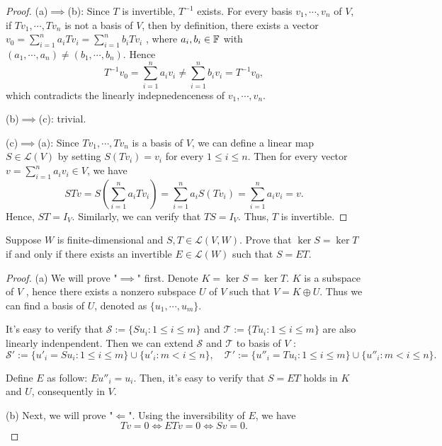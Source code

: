 \documentclass{article}
\begin{document}
\begin{proof}
    (a)\( \implies \)(b): Since \( T  \) is invertible, \( T^{-1} \) exists. For every basis \( v_1,\cdots,v_n \) of \( V \), if \( Tv_1,\cdots,Tv_n \) is not a basis of \( V \), then by definition, there exists a vector \( v_0=\sum_{i=1}^{n} a_iTv_i=\sum_{i=1}^{n} b_iTv_i \) , where \( a_i,b_i\in\mathbb{F} \) with \( (a_1,\cdots,a_n)\neq(b_1,\cdots,b_n) \). Hence
    \[ T^{-1}v_0=\sum_{i=1}^{n} a_iv_i\neq \sum_{i=1}^{n} b_iv_i=T^{-1}v_0, \] 
    which contradicts the linearly indepnedenceness of \( v_1,\cdots,v_n \).\par
    (b)\( \implies \)(c): trivial.\par
    (c)\( \implies \)(a): Since \( Tv_1,\cdots,Tv_n \) is a basis of \( V \), we can define a linear map \( S\in\mathcal{L}(V) \) by setting \( S(Tv_i)=v_i \) for every \( 1\le i\le n \). Then for every vector \( v=\sum_{i=1}^n a_i v_i\in V  \), we have
    \[ STv=S\left(\sum_{i=1}^n a_i Tv_i\right)=\sum_{i=1}^n a_i S(Tv_i)=\sum_{i=1}^n a_i v_i=v. \]
    Hence, \( ST=I_V  \). Similarly, we can verify that \( TS=I_V  \). Thus, \( T  \) is invertible.
\end{proof}

\begin{problem}[3D-6]
    Suppose \( W \) is finite-dimensional and \( S,T\in\mathcal{L}(V,W) \). Prove that
    \( \ker S=\ker T \) if and only if there exists an invertible \( E\in\mathcal{L}(W) \)
    such that \( S=ET \).
\end{problem}

\begin{proof}
    (a) We will prove "\( \implies \)" first. Denote \( K=\ker S=\ker T \). \( K \) is a subspace of \( V \) , hence there exists a nonzero subspace \( U \) of \( V \) such that \( V=K\oplus U \). Thus we can find a basis of \( U \), denoted as \( \{u_1,\cdots,u_m\} \). \par
    It's easy to verify that \( \mathcal{S}:=\{Su_i:1\le i\le m\} \) and \( \mathcal{T}:=\{Tu_i:1\le i\le m\} \) are also linearly indenpendent. Then we can extend \( \mathcal{S} \) and \( \mathcal{T} \) to basis of \( V \) :
    \[ \mathcal{S'}:=\{u'_i=Su_i:1\le i\le m\}\cup\{u'_i:m<i\le n\},\quad \mathcal{T'}:=\{u''_i=Tu_i:1\le i\le m\}\cup\{u''_i:m<i\le n\}. \]\par
    Define \( E \) as follow: \( Eu''_i=u_i \). Then, it's easy to verify that \( S=ET \) holds in \( K \) and \( U \), consequently in \( V \). \par
    (b) Next, we will prove "\( \Longleftarrow \)". Using the inversibility of \( E \), we have
    \[ Tv=0\iff ETv=0\iff Sv=0. \] 
\end{proof}
\end{document}
